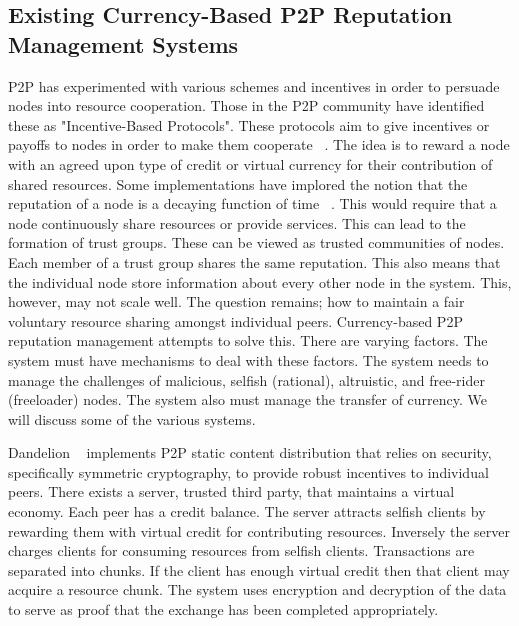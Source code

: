 \documentclass[%
				10pt,
        final,
        notitlepage,
        narroweqnarray,
        inline,
        twoside,
        ]{ieee}
\begin{document}
\subsection{Existing Currency-Based P2P Reputation Management Systems}
P2P has experimented with various schemes and incentives in order to persuade nodes into resource cooperation.  Those in the P2P community have identified these as "Incentive-Based Protocols".  These protocols aim to give incentives or payoffs to nodes in order to make them cooperate ~\cite{gupta}.  The idea is to reward a node with an agreed upon type of credit or virtual currency for their contribution of shared resources.  Some implementations have implored the notion that the reputation of a node is a decaying function of time ~\cite{gupta}.  This would require that a node continuously share resources or provide services.  This can lead to the formation of trust groups.  These can be viewed as trusted communities of nodes.  Each member of a trust group shares the same reputation.  This also means that the individual node store information about every other node in the system.  This, however, may not scale well.  The question remains; how to maintain a fair voluntary resource sharing amongst individual peers.  Currency-based P2P reputation management attempts to solve this.  There are varying factors.  The system must have mechanisms to deal with these factors.  The system needs to manage the challenges of malicious, selfish (rational), altruistic, and free-rider (freeloader) nodes.  The system also must manage the transfer of currency.  We will discuss some of the various systems.  

Dandelion ~\cite{sirivianos} implements P2P static content distribution that relies on security, specifically symmetric cryptography, to provide robust incentives to individual peers.  There exists a server, trusted third party, that maintains a virtual economy.  Each peer has a credit balance.  The server attracts selfish clients by rewarding them with virtual credit for contributing resources.  Inversely the server charges clients for consuming resources from selfish clients.  Transactions are separated into chunks.  If the client has enough virtual credit then that client may acquire a resource chunk.  The system uses encryption and decryption of the data to serve as proof that the exchange has been completed appropriately.  
\end{document}
